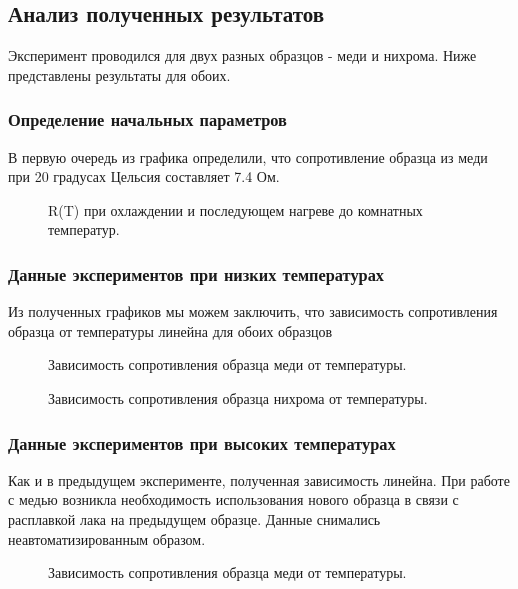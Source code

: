 \documentclass[a4paper, 12pt]{article}
\begin{document}
\subsection{Анализ полученных результатов}

Эксперимент проводился для двух разных образцов -  меди и нихрома. Ниже представлены результаты для обоих.

\subsubsection{Определение начальных параметров}

В первую очередь из графика определили, что сопротивление образца из меди при 20 градусах Цельсия составляет 7.4 Ом. 

\begin{figure}[H]
	\centering
	\caption{R(T) при охлаждении и последующем нагреве до комнатных температур.}
	\label{fig:1_Const}
\end{figure}

\subsubsection{Данные экспериментов при низких температурах}
Из полученных графиков мы можем заключить, что зависимость сопротивления образца от температуры линейна для обоих образцов

\begin{figure}[H]
	\centering
	\caption{Зависимость сопротивления образца меди от температуры.}
	\label{fig:1_Cu_Cooling}
\end{figure}

\begin{figure}[H]
	\centering
	\caption{Зависимость сопротивления образца нихрома от температуры.}
	\label{fig:1_Ni_Cooling}
\end{figure}


\subsubsection{Данные экспериментов при высоких температурах}
Как и в предыдущем эксперименте, полученная зависимость линейна. При работе с медью возникла необходимость использования нового образца в связи с расплавкой лака на предыдущем образце. Данные снимались неавтоматизированным образом.
\begin{figure}[H]
	\centering
	\caption{Зависимость сопротивления образца меди от температуры.}
	\label{fig:1_Cu_Heating}
\end{figure}
\end{document}
